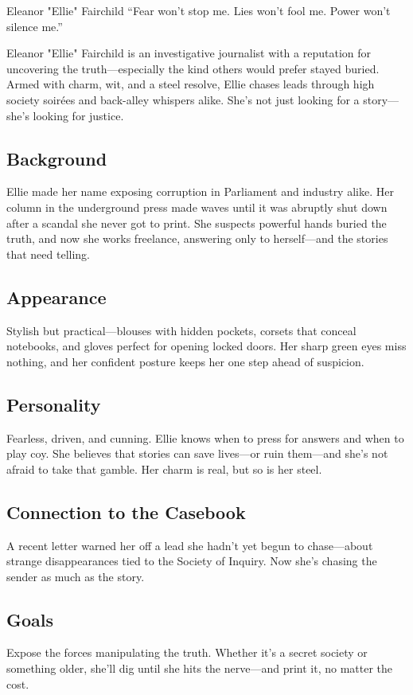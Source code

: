 \begin{WyrdCharacterSheet}
    {Eleanor "Ellie" Fairchild} 
    {“Fear won't stop me. Lies won't fool me. Power won't silence me.”}
    \label{pc:eleanor-fairchild}

    Eleanor "Ellie" Fairchild is an investigative journalist with a reputation for uncovering the truth—especially the kind others would prefer stayed buried. Armed with charm, wit, and a steel resolve, Ellie chases leads through high society soirées and back-alley whispers alike. She’s not just looking for a story—she’s looking for justice.

    \subsection{Background}
    Ellie made her name exposing corruption in Parliament and industry alike. Her column in the underground press made waves until it was abruptly shut down after a scandal she never got to print. She suspects powerful hands buried the truth, and now she works freelance, answering only to herself—and the stories that need telling.

    \subsection{Appearance}
    Stylish but practical—blouses with hidden pockets, corsets that conceal notebooks, and gloves perfect for opening locked doors. Her sharp green eyes miss nothing, and her confident posture keeps her one step ahead of suspicion.

    \subsection{Personality}
    Fearless, driven, and cunning. Ellie knows when to press for answers and when to play coy. She believes that stories can save lives—or ruin them—and she’s not afraid to take that gamble. Her charm is real, but so is her steel.

    \subsection{Connection to the Casebook}
    A recent letter warned her off a lead she hadn’t yet begun to chase—about strange disappearances tied to the Society of Inquiry. Now she’s chasing the sender as much as the story.

    \subsection{Goals}
    Expose the forces manipulating the truth. Whether it’s a secret society or something older, she’ll dig until she hits the nerve—and print it, no matter the cost.


\end{WyrdCharacterSheet}
